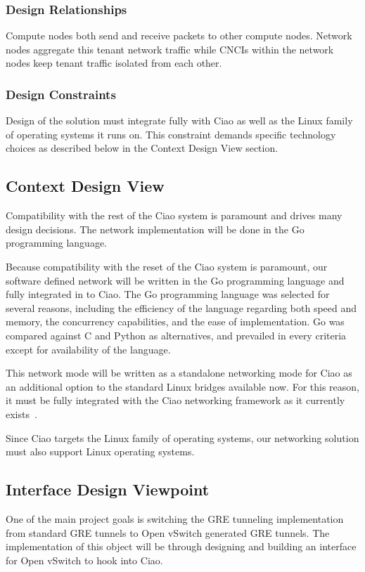 \documentclass[10pt,onecolumn,journal,draftclsnofoot]{IEEEtran}
\begin{document}
\subsubsection{Design Relationships}

Compute nodes both send and receive packets to other compute nodes. Network
nodes aggregate this tenant network traffic while CNCIs within the network nodes
keep tenant traffic isolated from each other.

\subsubsection{Design Constraints}

Design of the solution must integrate fully with Ciao as well as the Linux
family of operating systems it runs on. This constraint demands specific
technology choices as described below in the Context Design View section.

\subsection{Context Design View}

Compatibility with the rest of the Ciao system is paramount and drives many
design decisions. The network implementation will be done in the Go 
programming language.

Because compatibility with the reset of the Ciao system is paramount, our
software defined network will be written in the Go programming language and
fully integrated in to Ciao. The Go programming language was selected for
several reasons, including the efficiency of the language regarding both speed
and memory, the concurrency capabilities, and the ease of implementation. Go was
compared against C and Python as alternatives, and prevailed in every criteria
except for availability of the language.

This network mode will be written as a standalone networking mode for Ciao as an
additional option to the standard Linux bridges available now. For this reason,
it must be fully integrated with the Ciao networking framework as it currently
exists~\cite{ciaoNetworking}.

Since Ciao targets the Linux family of operating systems, our networking
solution must also support Linux operating systems.

\subsection{Interface Design Viewpoint}
One of the main project goals is switching the GRE tunneling implementation 
from standard GRE tunnels to Open vSwitch generated GRE tunnels. The
implementation of this object will be through designing and building an
interface for Open vSwitch to hook into Ciao. 
\end{document}
